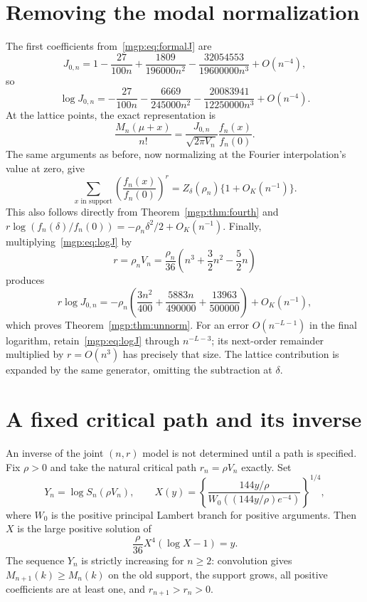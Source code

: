 \documentclass[11pt]{article}
\newcommand{\V}{V_n}\newcommand{\T}{T_{n,r}}\newcommand{\Z}{\mathbb Z}\newcommand{\E}{\mathbb E}\newcommand{\dd}{\,d}
\begin{document}
\section{Removing the modal normalization}
The first coefficients from~\eqref{mgp:eq:formalJ} are
\[
 J_{0,n}=1-\frac{27}{100n}+\frac{1809}{196000n^2}
             -\frac{32054553}{19600000n^3}+O(n^{-4}),
\]
so
\begin{equation}\label{mgp:eq:logJ}
 \log J_{0,n}=-\frac{27}{100n}-\frac{6669}{245000n^2}
                    -\frac{20083941}{12250000n^3}+O(n^{-4}).
\end{equation}
At the lattice points, the exact representation is
\[
 \frac{M_n(\mu+x)}{n!}
 =\frac{J_{0,n}}{\sqrt{2\pi\V}}\frac{f_n(x)}{f_n(0)}.
\]
The same arguments as before, now normalizing at the Fourier interpolation's value at zero, give
\[
 \sum_{x\text{ in support}}\left(\frac{f_n(x)}{f_n(0)}\right)^r
 =Z_\delta(\rho_n)\{1+O_K(n^{-1})\}.
\]
This also follows directly from Theorem~\ref{mgp:thm:fourth} and
$r\log(f_n(\delta)/f_n(0))=-\rho_n\delta^2/2+O_K(n^{-1})$.
Finally, multiplying~\eqref{mgp:eq:logJ} by
\[
 r=\rho_n\V=\frac{\rho_n}{36}
              \left(n^3+\frac32n^2-\frac52n\right)
\]
produces
\[
 r\log J_{0,n}=-\rho_n\left(\frac{3n^2}{400}
                  +\frac{5883n}{490000}
                  +\frac{13963}{500000}\right)+O_K(n^{-1}),
\]
which proves Theorem~\ref{mgp:thm:unnorm}. For an error $O(n^{-L-1})$ in the final logarithm, retain~\eqref{mgp:eq:logJ} through $n^{-L-3}$; its next-order remainder multiplied by $r=O(n^3)$ has precisely that size. The lattice contribution is expanded by the same generator, omitting the subtraction at $\delta$.


\section{A fixed critical path and its inverse}
An inverse of the joint $(n,r)$ model is not determined until a path is specified. Fix $\rho>0$ and take the natural critical path $r_n=\rho\V$ exactly. Set
\[
 Y_n=\log S_n(\rho\V),\qquad
 X(y)=\left\{\frac{144y/\rho}{W_0((144y/\rho)e^{-4})}\right\}^{1/4},
\]
where $W_0$ is the positive principal Lambert branch for positive arguments. Then $X$ is the large positive solution of
\[
 \frac\rho{36}X^4(\log X-1)=y.
\]
The sequence $Y_n$ is strictly increasing for $n\ge2$: convolution gives $M_{n+1}(k)\ge M_n(k)$ on the old support, the support grows, all positive coefficients are at least one, and $r_{n+1}>r_n>0$.
\end{document}
